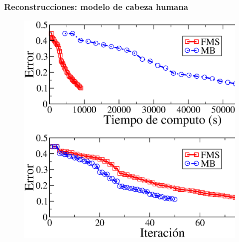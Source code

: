 
\begin{frame}
\frametitle{Reconstrucciones: modelo de cabeza humana}
\begin{figure}
\centering
  \includegraphics[height=0.9\textheight]{figuras/l2err.eps}\\
\end{figure}


\end{frame}


